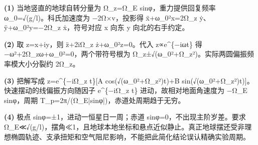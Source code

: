 \par\noindent\textbf{(1)} 当地竖直的地球自转分量为 Ω\_z=Ω\_E sinφ，重力提供回复频率 ω\_0=√(g/l)。科氏加速度为 −2Ω×v，投影得 ẍ+ω\_0²x=2Ω\_z ẏ、ÿ+ω\_0²y=−2Ω\_z ẋ，符号对应 x 向东 y 向北的右手约定。
\par\noindent\textbf{(2)} 取 z=x+iy，则 z̈+2iΩ\_z ż+ω\_0²z=0。代入 z∝e\textasciicircum{}\{−iωt\} 得 −ω²+2Ω\_zω+ω\_0²=0，两个带符号根为 Ω\_z±√(ω\_0²+Ω\_z²)。实际两圆偏振频率模大小分裂约 2Ω\_z。
\par\noindent\textbf{(3)} 把解写成 z=e\textasciicircum{}\{−iΩ\_z t\}[A cos(√(ω\_0²+Ω\_z²)t)+B sin(√(ω\_0²+Ω\_z²)t)]。快速摆动的线偏振方向随因子 e\textasciicircum{}\{−iΩ\_z t\} 进动，故相对地面角速度为 −Ω\_E sinφ，周期 T\_p=2π/(Ω\_E|sinφ|)，赤道处周期趋于无穷。
\par\noindent\textbf{(4)} 极点 sinφ=±1，进动一恒星日一周；赤道 sinφ=0，不出现主阶岁差。要求 Ω\_E≪√(g/l)，摆角≪1，且地球本地坐标和悬点近似静止。真正地球摆还受非理想椭圆轨迹、支承扭矩和空气阻尼影响，不能把此简化结论误认精确实验周期。
